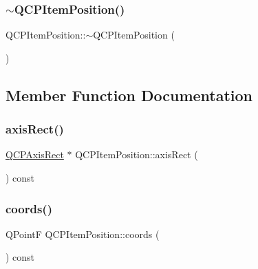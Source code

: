 \subsubsection{\texorpdfstring{$\sim$QCPItemPosition()}{~QCPItemPosition()}}
{\footnotesize\ttfamily Q\+C\+P\+Item\+Position\+::$\sim$\+Q\+C\+P\+Item\+Position (\begin{DoxyParamCaption}{ }\end{DoxyParamCaption})\hspace{0.3cm}{\ttfamily [virtual]}}



\subsection{Member Function Documentation}
\mbox{\label{class_q_c_p_item_position_ae4081cfe7575f922f403c6e3a2ce7891}} 
\subsubsection{\texorpdfstring{axisRect()}{axisRect()}}
{\footnotesize\ttfamily \mbox{\hyperlink{class_q_c_p_axis_rect}{Q\+C\+P\+Axis\+Rect}} $\ast$ Q\+C\+P\+Item\+Position\+::axis\+Rect (\begin{DoxyParamCaption}{ }\end{DoxyParamCaption}) const}

\mbox{\label{class_q_c_p_item_position_aa4ecf5b04c67049c05d37619e090820b}} 
\subsubsection{\texorpdfstring{coords()}{coords()}}
{\footnotesize\ttfamily Q\+PointF Q\+C\+P\+Item\+Position\+::coords (\begin{DoxyParamCaption}{ }\end{DoxyParamCaption}) const\hspace{0.3cm}{\ttfamily [inline]}}

\mbox{\label{class_q_c_p_item_position_a6fc519f1b73722a8d0cff7d4d647407e}} 
